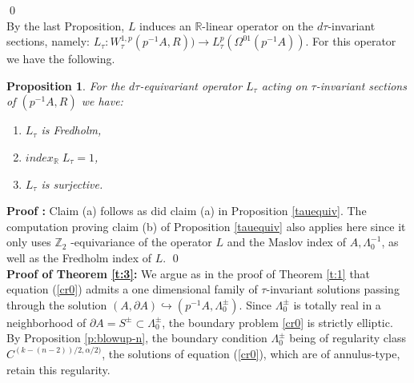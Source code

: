 \documentclass{amsart}
\newtheorem{proposition}[theorem]{Proposition}
\begin{document}
\qed \\
By the last Proposition, $L$ induces an ${\mathbb{R}}$-linear operator on the $ d \tau$-invariant sections, namely:
 $L_\tau:W^{1,p}_{\tau}(p^{-1}A,R))\to L^p_\tau(\Omega^{01}(p^{-1}A))$. For this operator we have the following.
\begin{proposition}
\label{Ltau}
For the $d \tau$-equivariant operator 
$L_\tau$ acting on $\tau$-invariant sections of $(p^{-1}A, R)$ we have: 
\begin{enumerate}
\item[(a)] $L_\tau$ is Fredholm,
\item[(b)] $index_{{\mathbb{R}}}\;  L_\tau=1$,
\item[(c)] $L_\tau$ is surjective. 
\end{enumerate} 
\end{proposition} 
 \noindent
 {\bf Proof :} Claim (a) follows as did claim (a) in
Proposition \ref{tauequiv}. The computation proving claim (b) of Proposition \ref{tauequiv} also applies here since it only uses $\mathbb{Z}_2$ -equivariance of the operator $L$ and the Maslov index of $A, \Lambda_0^{-1}$, as well as the Fredholm index of $L.$
\qed \\

\noindent
{\bf Proof of Theorem \ref{t:3}:}  We argue as in the proof of Theorem \ref{t:1}  that equation (\ref{cr0}) admits a one dimensional family of $ \tau$-invariant solutions passing through the solution $(A, \partial A) \hookrightarrow (p^{-1}A,\Lambda_0^{\pm})$. Since $\Lambda_0^\pm$ is totally real in a neighborhood of $\partial A=S^\pm \subset  \Lambda_0^\pm$, the boundary problem \eqref{cr0} is strictly elliptic. By Proposition \ref{p:blowup-n},  the boundary condition $\Lambda_0^\pm$ being of regularity class $C^{(k-(n-2))/2, \alpha/2)}$, the solutions of equation (\ref{cr0}), which are of annulus-type, retain this regularity. 
\end{document}
